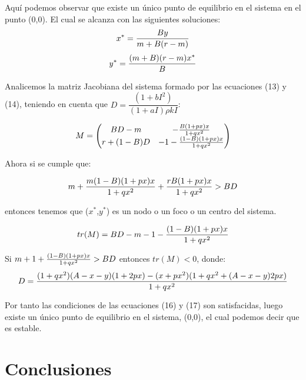 \documentclass{article}
\begin{document}
Aqu\'i podemos observar que existe un \'unico punto de equilibrio en el sistema en el punto (0,0). El cual se alcanza con las siguientes soluciones: $$x^*={By\over m+B(r-m)}$$ $$y^*={(m+B)(r-m)x^*\over B}$$

Analicemos la matriz Jacobiana del sistema formado por las ecuaciones (13) y (14), teniendo en cuenta que $D = \dfrac{(1+bI^2)}{(1+aI)\rho kI}$:

\begin{equation}
	M=\left(
	\begin{matrix}
		 BD-m & -{B(1+px)x\over 1+qx^2}\\
		 r+(1-B)D & -1-{(1-B)(1+px)x\over 1+qx^2}
	\end{matrix}
	\right)
\end{equation}

Ahora si se cumple que:

\begin{equation}
m+{m(1-B)(1+px)x\over 1+qx^2}+{rB(1+px)x\over 1+qx^2}>BD
\end{equation}

entonces tenemos que ($x^*$,$y^*$) es un nodo o un foco o un centro del sistema.

\begin{equation}
	tr(M)=BD-m-1-{(1-B)(1+px)x\over 1+qx^2}
\end{equation}

Si $m+1+{(1-B)(1+px)x\over 1+qx^2}>BD$ entonces $tr(M)<0$, donde:
$$D={(1+qx^2)(A-x-y)(1+2px)-(x+px^2)(1+qx^2+(A-x-y)2px)\over 1+qx^2}$$

Por tanto las condiciones de las ecuaciones (16) y (17) son satisfacidas, luego existe un \'unico punto de equilibrio en el sistema, (0,0), el cual podemos decir que es estable. 
	
\section{Conclusiones}
\end{document}

